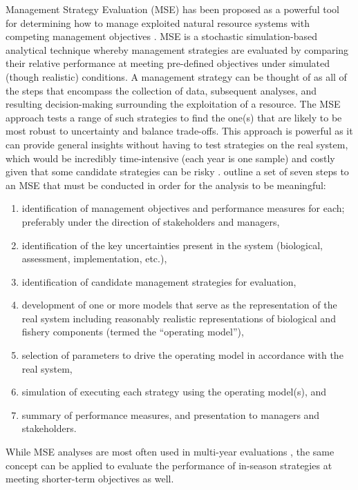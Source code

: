 \documentclass[12pt,]{book}
\theoremstyle{definition}
\theoremstyle{definition}
\theoremstyle{definition}
\theoremstyle{remark}
\begin{document}
Management Strategy Evaluation (MSE) has been proposed as a powerful
tool for determining how to manage exploited natural resource systems
with competing management objectives
\citep{cooke-1999, butterworth-2007}. MSE is a stochastic
simulation-based analytical technique whereby management strategies are
evaluated by comparing their relative performance at meeting pre-defined
objectives under simulated (though realistic) conditions. A management
strategy can be thought of as all of the steps that encompass the
collection of data, subsequent analyses, and resulting decision-making
surrounding the exploitation of a resource. The MSE approach tests a
range of such strategies to find the one(s) that are likely to be most
robust to uncertainty and balance trade-offs. This approach is powerful
as it can provide general insights without having to test strategies on
the real system, which would be incredibly time-intensive (each year is
one sample) and costly given that some candidate strategies can be risky
\citep{walters-martell-2004}. \citet{punt-etal-2014} outline a set of
seven steps to an MSE that must be conducted in order for the analysis
to be meaningful:

\begin{enumerate}
\def\labelenumi{(\arabic{enumi})}
\item
  identification of management objectives and performance measures for
  each; preferably under the direction of stakeholders and managers,
\item
  identification of the key uncertainties present in the system
  (biological, assessment, implementation, etc.),
\item
  identification of candidate management strategies for evaluation,
\item
  development of one or more models that serve as the representation of
  the real system including reasonably realistic representations of
  biological and fishery components (termed the ``operating model''),
\item
  selection of parameters to drive the operating model in accordance
  with the real system,
\item
  simulation of executing each strategy using the operating model(s),
  and
\item
  summary of performance measures, and presentation to managers and
  stakeholders.
\end{enumerate}

\noindent
While MSE analyses are most often used in multi-year evaluations
\citep{cooke-1999}, the same concept can be applied to evaluate the
performance of in-season strategies at meeting shorter-term objectives
as well.
\end{document}
